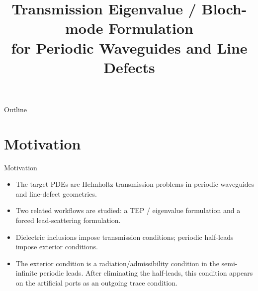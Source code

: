\documentclass[aspectratio=169]{beamer}
\title[TEP / Bloch Formulation]{Transmission Eigenvalue / Bloch-mode Formulation\\for Periodic Waveguides and Line Defects}
\author{}
\date{}
\begin{document}
\begin{frame}
  \titlepage
\end{frame}

\begin{frame}{Outline}
  \tableofcontents
\end{frame}

\section{Motivation}

\begin{frame}{Motivation}
  \begin{itemize}
    \item The target PDEs are Helmholtz transmission problems in periodic waveguides and line-defect geometries.
    \item Two related workflows are studied: a TEP / eigenvalue formulation and a forced lead-scattering formulation.
    \item Dielectric inclusions impose transmission conditions; periodic half-leads impose exterior conditions.
    \item The exterior condition is a radiation/admissibility condition in the semi-infinite periodic leads. After eliminating the half-leads, this condition appears on the artificial ports as an outgoing trace condition.
  \end{itemize}
\end{frame}
\end{document}
